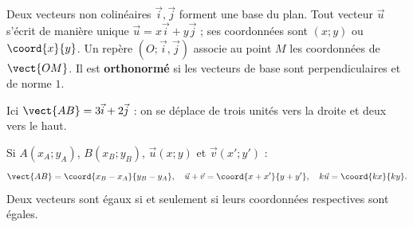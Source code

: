\begin{cours}[Définitions]
Deux vecteurs non colinéaires $\vec i,\vec j$ forment une base du plan. Tout vecteur $\vec u$ s'écrit de manière unique $\vec u=x\vec i+y\vec j$ ; ses coordonnées sont $(x;y)$ ou $\coord{x}{y}$.
Un repère $(O;\vec i,\vec j)$ associe au point $M$ les coordonnées de $\vect{OM}$. Il est \textbf{orthonormé} si les vecteurs de base sont perpendiculaires et de norme $1$.
\end{cours}
\begin{center}\end{center}
Ici $\vect{AB}=3\vec i+2\vec j$ : on se déplace de trois unités vers la droite et deux vers le haut.
\begin{cours}
Si $A(x_A;y_A)$, $B(x_B;y_B)$, $\vec u(x;y)$ et $\vec v(x';y')$ :
\[\vect{AB}=\coord{x_B-x_A}{y_B-y_A},\quad \vec u+\vec v=\coord{x+x'}{y+y'},\quad k\vec u=\coord{kx}{ky}.\]
Deux vecteurs sont égaux si et seulement si leurs coordonnées respectives sont égales.
\end{cours}

